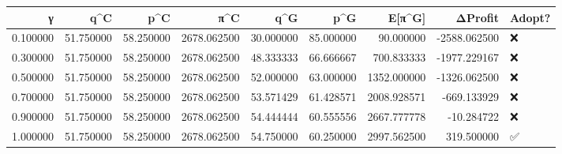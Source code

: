 \begin{tabular}{rrrrrrrrl}
\toprule
γ & q^C & p^C & π^C & q^G & p^G & E[π^G] & ΔProfit & Adopt? \\
\midrule
0.100000 & 51.750000 & 58.250000 & 2678.062500 & 30.000000 & 85.000000 & 90.000000 & -2588.062500 & ❌ \\
0.300000 & 51.750000 & 58.250000 & 2678.062500 & 48.333333 & 66.666667 & 700.833333 & -1977.229167 & ❌ \\
0.500000 & 51.750000 & 58.250000 & 2678.062500 & 52.000000 & 63.000000 & 1352.000000 & -1326.062500 & ❌ \\
0.700000 & 51.750000 & 58.250000 & 2678.062500 & 53.571429 & 61.428571 & 2008.928571 & -669.133929 & ❌ \\
0.900000 & 51.750000 & 58.250000 & 2678.062500 & 54.444444 & 60.555556 & 2667.777778 & -10.284722 & ❌ \\
1.000000 & 51.750000 & 58.250000 & 2678.062500 & 54.750000 & 60.250000 & 2997.562500 & 319.500000 & ✅ \\
\bottomrule
\end{tabular}

